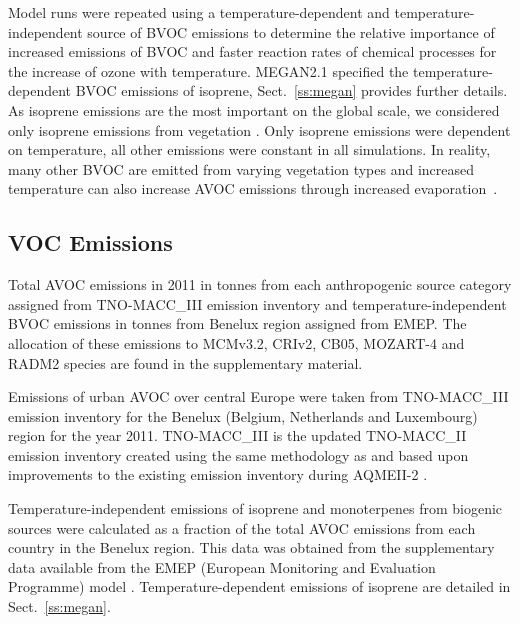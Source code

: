 Model runs were repeated using a temperature-dependent and temperature-independent source of BVOC emissions to determine the relative importance of increased emissions of BVOC and faster reaction rates of chemical processes for the increase of ozone with temperature. 
MEGAN2.1 \citep{Guenther:2012} specified the temperature-dependent BVOC emissions of isoprene, Sect.~\ref{ss:megan} provides further details. 
As isoprene emissions are the most important on the global scale, we considered only isoprene emissions from vegetation \citep{Guenther:2006}. 
Only isoprene emissions were dependent on temperature, all other emissions were constant in all simulations.
In reality, many other BVOC are emitted from varying vegetation types \citep{Guenther:2006} and increased temperature can also increase AVOC emissions through increased \mbox{evaporation \citep{Rubin:2006}}.

\subsection{VOC Emissions} \label{ss:VOC_emissions}
{%
    \renewcommand{\arraystretch}{1.1}%
    \begin{table}[t]%
        \centering%
        \caption{Total AVOC emissions in 2011 in tonnes from each anthropogenic source category assigned from TNO-MACC\_III emission inventory and temperature-independent BVOC emissions in tonnes from Benelux region assigned from EMEP. The allocation of these emissions to MCMv3.2, CRIv2, CB05, MOZART-4 and RADM2 species are found in the supplementary material.}%
        \label{t:emissions}%
    \end{table}%
}
Emissions of urban AVOC over central Europe were taken from TNO-MACC\_III emission inventory for the Benelux (Belgium, Netherlands and Luxembourg) region for the year 2011.
TNO-MACC\_III is the updated TNO-MACC\_II emission inventory created using the same methodology as \citet{Kuenen:2014} and based upon improvements to the existing emission inventory during AQMEII-2 \citep{Pouliot:2015}. 

Temperature-independent emissions of isoprene and monoterpenes from biogenic sources were calculated as a fraction of the total AVOC emissions from each country in the Benelux region.
This data was obtained from the supplementary data available from the EMEP (European Monitoring and Evaluation Programme) model \citep{Simpson:2012}.
Temperature-dependent emissions of isoprene are detailed in Sect.~\ref{ss:megan}.

